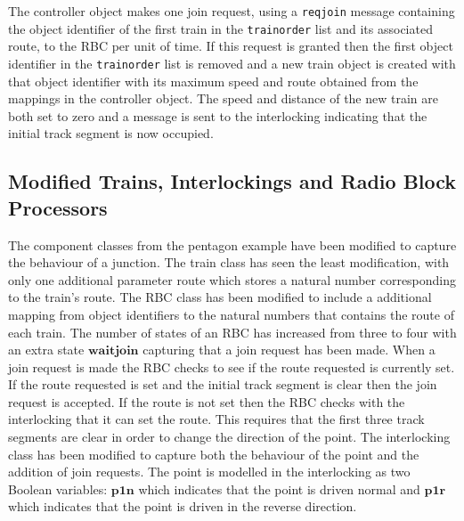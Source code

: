 The controller object makes one join request, using a \texttt{reqjoin} message containing the object identifier of the first train in the \texttt{trainorder} list and its associated route, to the RBC per unit of time. If this request is granted then the first object identifier in the \texttt{trainorder} list is removed and a new train object is created with that object identifier with its maximum speed and route obtained from the mappings in the controller object. The speed and distance of the new train are both set to zero and a message is sent to the interlocking indicating that the initial track segment is now occupied. 

\subsection*{Modified Trains, Interlockings and Radio Block Processors}
The component classes from the pentagon example have been modified to capture the behaviour of a junction.  The train class has seen the least modification, with only one additional parameter route which stores a natural number corresponding to the train's route. The RBC class has been modified to include a additional mapping from object identifiers to the natural numbers that contains the route of each train. The number of states of an RBC has increased from three to four with an extra state $\mathbf{waitjoin}$ capturing that a join request has been made. When a join request is made the RBC checks to see if the route requested is currently set. If the route requested is set and the initial track segment is clear then the join request is accepted. If the route is not set then the RBC checks with the interlocking that it can set the route. This requires that the first three track segments are clear in order to change the direction of the point. The interlocking class has been modified to capture both the behaviour of the point and the addition of join requests. The point is modelled in the interlocking as two Boolean variables: $\mathbf{p1n}$ which indicates that the point is driven normal and $\mathbf{p1r}$ which indicates that the point is driven in the reverse direction.
%

